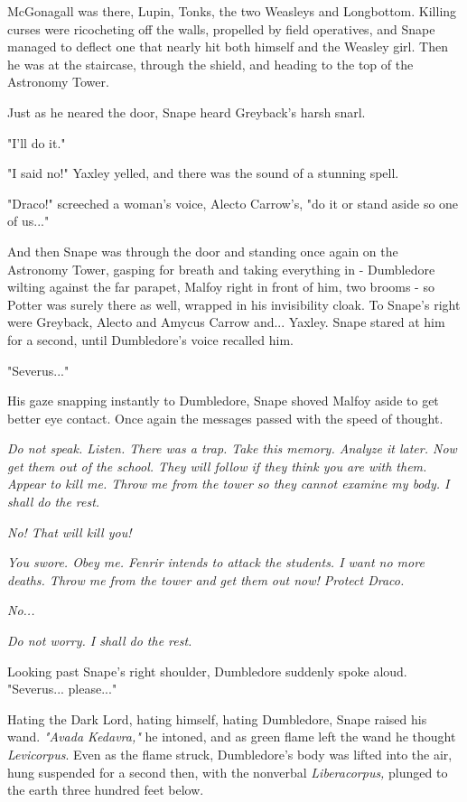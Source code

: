 \documentclass[a4paper,11pt]{article}
\begin{document}
McGonagall was there, Lupin, Tonks, the two Weasleys and Longbottom. Killing curses were ricocheting off the walls, propelled by field operatives, and Snape managed to deflect one that nearly hit both himself and the Weasley girl. Then he was at the staircase, through the shield, and heading to the top of the Astronomy Tower.

Just as he neared the door, Snape heard Greyback's harsh snarl.

"I'll do it."

"I said no!" Yaxley yelled, and there was the sound of a stunning spell.

"Draco!" screeched a woman's voice, Alecto Carrow's, "do it or stand aside so one of us..."

And then Snape was through the door and standing once again on the Astronomy Tower, gasping for breath and taking everything in - Dumbledore wilting against the far parapet, Malfoy right in front of him, two brooms - so Potter was surely there as well, wrapped in his invisibility cloak. To Snape's right were Greyback, Alecto and Amycus Carrow and... Yaxley. Snape stared at him for a second, until Dumbledore's voice recalled him.

"Severus..."

His gaze snapping instantly to Dumbledore, Snape shoved Malfoy aside to get better eye contact. Once again the messages passed with the speed of thought.

\emph{Do not speak. Listen. There was a trap. Take this memory. Analyze it later. Now get them out of the school. They will follow if they think you are with them. Appear to kill me. Throw me from the tower so they cannot examine my body. I shall do the rest.}

\emph{No! That will kill you!}

\emph{You swore. Obey me. Fenrir intends to attack the students. I want no more deaths. Throw me from the tower and get them out now! Protect Draco.}

\emph{No...}

\emph{Do not worry. I shall do the rest.}

Looking past Snape's right shoulder, Dumbledore suddenly spoke aloud. "Severus... please..."

Hating the Dark Lord, hating himself, hating Dumbledore, Snape raised his wand. \emph{"Avada Kedavra,"} he intoned, and as green flame left the wand he thought \emph{Levicorpus}. Even as the flame struck, Dumbledore's body was lifted into the air, hung suspended for a second then, with the nonverbal \emph{Liberacorpus,} plunged to the earth three hundred feet below.
\end{document}
